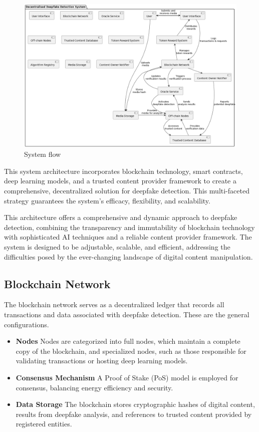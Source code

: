\documentclass{article}
\begin{document}
\begin{figure}
	\centering
        \includegraphics[width=15cm]{diagram3.png}
        \caption{System flow}
	\label{fig:fig1}
\end{figure}

This system architecture incorporates blockchain technology, smart contracts, deep learning models, and a trusted content provider framework to create a comprehensive, decentralized solution for deepfake detection. This multi-faceted strategy guarantees the system's efficacy, flexibility, and scalability.

This architecture offers a comprehensive and dynamic approach to deepfake detection, combining the transparency and immutability of blockchain technology with sophisticated AI techniques and a reliable content provider framework. The system is designed to be adjustable, scalable, and efficient, addressing the difficulties posed by the ever-changing landscape of digital content manipulation.

\subsection{Blockchain Network}

The blockchain network serves as a decentralized ledger that records all transactions and data associated with deepfake detection. These are the general configurations.

\begin{itemize}
    \item \textbf{Nodes}  Nodes are categorized into full nodes, which maintain a complete copy of the blockchain, and specialized nodes, such as those responsible for validating transactions or hosting deep learning models.
    \item \textbf{Consensus Mechanism} A Proof of Stake (PoS) model is employed for consensus, balancing energy efficiency and security.
    \item \textbf{Data Storage} The blockchain stores cryptographic hashes of digital content, results from deepfake analysis, and references to trusted content provided by registered entities.
\end{itemize}
\end{document}
